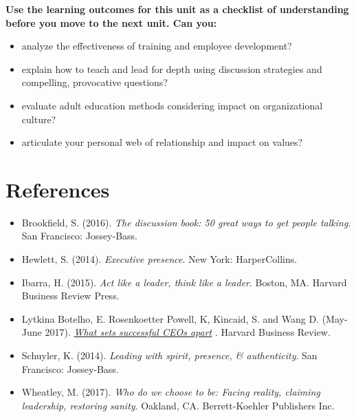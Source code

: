 \documentclass[
]{book}
\providecommand{\tightlist}{%
  \setlength{\itemsep}{0pt}\setlength{\parskip}{0pt}}
\begin{document}
\begin{progress}
\textbf{Use the learning outcomes for this unit as a checklist of
understanding before you move to the next unit. Can you:}

\begin{itemize}
\tightlist
\item
  analyze the effectiveness of training and employee development?\\
\item
  explain how to teach and lead for depth using discussion strategies
  and compelling, provocative questions?\\
\item
  evaluate adult education methods considering impact on organizational
  culture?\\
\item
  articulate your personal web of relationship and impact on values?
\end{itemize}
\end{progress}

\hypertarget{references-3}{%
\section*{References}\label{references-3}}

\begin{itemize}
\tightlist
\item
  Brookfield, S. (2016). \emph{The discussion book: 50 great ways to get people talking}. San Francisco: Jossey-Bass.\\
\item
  Hewlett, S. (2014). \emph{Executive presence}. New York: HarperCollins.\\
\item
  Ibarra, H. (2015). \emph{Act like a leader, think like a leader}. Boston, MA. Harvard Business Review Press.\\
\item
  Lytkina Botelho, E. Rosenkoetter Powell, K, Kincaid, S. and Wang D. (May-June 2017). \href{https://hbr.org/2017/05/what-sets-successful-ceos-apart}{\emph{What sets successful CEOs apart}} . Harvard Business Review.\\
\item
  Schuyler, K. (2014). \emph{Leading with spirit, presence, \& authenticity}. San Francisco: Jossey-Bass.\\
\item
  Wheatley, M. (2017). \emph{Who do we choose to be: Facing reality, claiming leadership, restoring sanity}. Oakland, CA. Berrett-Koehler Publishers Inc.~
\end{itemize}
\end{document}
